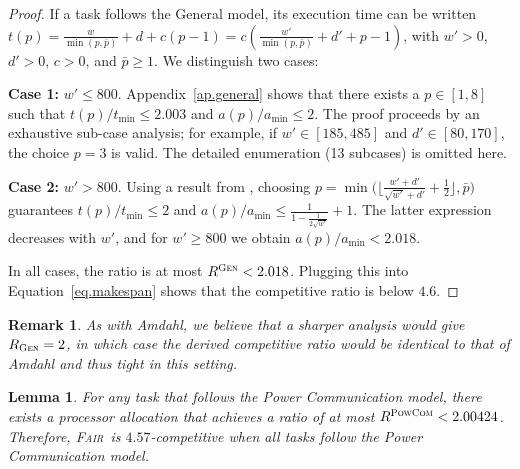 \documentclass{article}
\newtheorem{lemma}{Lemma}
\newtheorem{remark}{Remark}
\newcommand\fair{\textsc{Fair}\xspace}
\newcommand\GEN{\textsc{Gen}\xspace}
\newcommand\PCOM{\textsc{PowCom}\xspace}
\begin{document}
\begin{proof}
If a task follows the General model, its execution time can be written
$t(p) = \frac{w}{\min(p, \bar{p})} + d + c (p-1)
       = c\!\left( \frac{w'}{\min(p, \bar{p})} + d' + p - 1 \right)$,
with $w'>0$, $d'>0$, $c>0$, and $\bar{p}\ge 1$.
We distinguish two cases:

\textbf{Case 1:} $w' \le 800$.  
      Appendix~\ref{ap.general} shows that there exists a $p\in[1,8]$ such that
      $t(p)/t_{\min}\le 2.003$ and $a(p)/a_{\min}\le 2$.
      The proof proceeds by an exhaustive sub-case analysis; for example,
      if $w' \in [185,485]$ and $d' \in [80,170]$, the choice $p=3$ is valid.
      The detailed enumeration (13 subcases) is omitted here.

 \textbf{Case 2:} $w' > 800$.  
      Using a result from \cite{TOPC24}, choosing
      $p=\min\!\bigl(\lfloor \tfrac{w'+d'}{\sqrt{w'}+d'} + \tfrac12\rfloor,\bar{p}\bigr)$
      guarantees $t(p)/t_{\min}\le 2$ and
      $a(p)/a_{\min}\le \frac{1}{1-\frac{1}{2\sqrt{w'}}}+1$.
      The latter expression decreases with $w'$, and for $w'\ge 800$ we obtain
      $a(p)/a_{\min}<2.018$.


In all cases, the ratio is at most $R^{\GEN}<2.018$.
Plugging this into Equation~\ref{eq.makespan} shows that the competitive
ratio is below $4.6$.
\end{proof}

\begin{remark}
As with Amdahl, we believe that a sharper analysis would give
$R_{\GEN}=2$, in which case the derived competitive ratio would be identical
to that of Amdahl and thus tight in this setting.
\end{remark}

\begin{lemma}\label{lem.pcom}
For any task that follows the Power Communication model, there exists a processor allocation that achieves a ratio of at most $R^{\PCOM}<2.00424$. Therefore, \fair\ is $4.57$-competitive when all tasks follow the Power Communication model.
\end{lemma}
\end{document}
